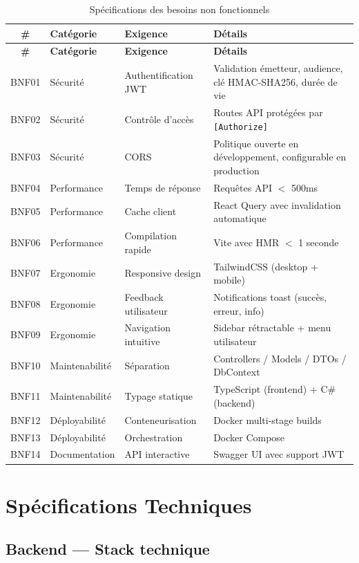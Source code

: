 \begin{longtable}{@{} c l p{5cm} p{5cm} @{}}
\toprule
\textbf{\#} & \textbf{Catégorie} & \textbf{Exigence} & \textbf{Détails} \\
\midrule
\endfirsthead
\toprule
\textbf{\#} & \textbf{Catégorie} & \textbf{Exigence} & \textbf{Détails} \\
\midrule
\endhead
\bottomrule
\caption{Spécifications des besoins non fonctionnels}
\label{tab:besoins_non_fonctionnels}
\endfoot
BNF01 & Sécurité & Authentification JWT & Validation émetteur, audience, clé HMAC-SHA256, durée de vie \\
BNF02 & Sécurité & Contrôle d'accès & Routes API protégées par \texttt{[Authorize]} \\
BNF03 & Sécurité & CORS & Politique ouverte en développement, configurable en production \\
BNF04 & Performance & Temps de réponse & Requêtes API $<$ 500ms \\
BNF05 & Performance & Cache client & React Query avec invalidation automatique \\
BNF06 & Performance & Compilation rapide & Vite avec HMR $<$ 1 seconde \\
BNF07 & Ergonomie & Responsive design & TailwindCSS (desktop + mobile) \\
BNF08 & Ergonomie & Feedback utilisateur & Notifications toast (succès, erreur, info) \\
BNF09 & Ergonomie & Navigation intuitive & Sidebar rétractable + menu utilisateur \\
BNF10 & Maintenabilité & Séparation & Controllers / Models / DTOs / DbContext \\
BNF11 & Maintenabilité & Typage statique & TypeScript (frontend) + C\# (backend) \\
BNF12 & Déployabilité & Conteneurisation & Docker multi-stage builds \\
BNF13 & Déployabilité & Orchestration & Docker Compose \\
BNF14 & Documentation & API interactive & Swagger UI avec support JWT \\
\end{longtable}

\section{Spécifications Techniques}

\subsection{Backend --- Stack technique}

